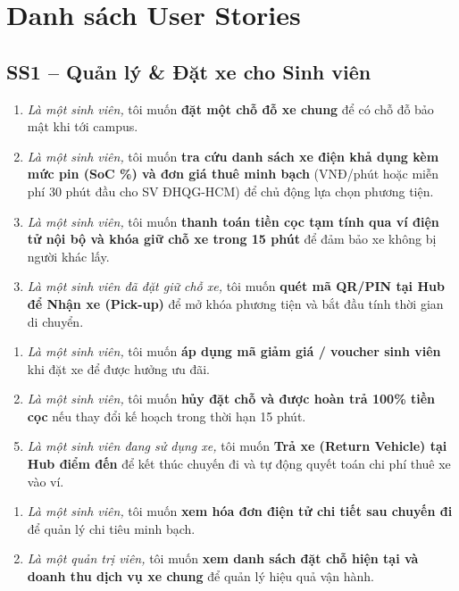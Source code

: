 \documentclass[12pt,a4paper]{report}
\begin{document}
\section{Danh sách User Stories}

\subsection{SS1 -- Quản lý \& Đặt xe cho Sinh viên}
\begin{enumerate}[nosep,label=\textbf{US-\arabic*:}]
    \item \textit{Là một sinh viên,} tôi muốn \textbf{đặt một chỗ đỗ xe chung} để có chỗ đỗ bảo mật khi tới campus.
    \item \textit{Là một sinh viên,} tôi muốn \textbf{tra cứu danh sách xe điện khả dụng kèm mức pin (SoC \%) và đơn giá thuê minh bạch} (VNĐ/phút hoặc miễn phí 30 phút đầu cho SV ĐHQG-HCM) để chủ động lựa chọn phương tiện.
    \item \textit{Là một sinh viên,} tôi muốn \textbf{thanh toán tiền cọc tạm tính qua ví điện tử nội bộ và khóa giữ chỗ xe trong 15 phút} để đảm bảo xe không bị người khác lấy.
\end{enumerate}
\begin{enumerate}[nosep,label=\textbf{US-\arabic*b:}]
    \setcounter{enumi}{2}
    \item \textit{Là một sinh viên đã đặt giữ chỗ xe,} tôi muốn \textbf{quét mã QR/PIN tại Hub để Nhận xe (Pick-up)} để mở khóa phương tiện và bắt đầu tính thời gian di chuyển.
\end{enumerate}
\begin{enumerate}[nosep,label=\textbf{US-0\arabic*:},start=4]
    \item \textit{Là một sinh viên,} tôi muốn \textbf{áp dụng mã giảm giá / voucher sinh viên} khi đặt xe để được hưởng ưu đãi.
    \item \textit{Là một sinh viên,} tôi muốn \textbf{hủy đặt chỗ và được hoàn trả 100\% tiền cọc} nếu thay đổi kế hoạch trong thời hạn 15 phút.
\end{enumerate}
\begin{enumerate}[nosep,label=\textbf{US-\arabic*b:}]
    \setcounter{enumi}{4}
    \item \textit{Là một sinh viên đang sử dụng xe,} tôi muốn \textbf{Trả xe (Return Vehicle) tại Hub điểm đến} để kết thúc chuyến đi và tự động quyết toán chi phí thuê xe vào ví.
\end{enumerate}
\begin{enumerate}[nosep,label=\textbf{US-0\arabic*:},start=6]
    \item \textit{Là một sinh viên,} tôi muốn \textbf{xem hóa đơn điện tử chi tiết sau chuyến đi} để quản lý chi tiêu minh bạch.
    \item \textit{Là một quản trị viên,} tôi muốn \textbf{xem danh sách đặt chỗ hiện tại và doanh thu dịch vụ xe chung} để quản lý hiệu quả vận hành.
\end{enumerate}
\end{document}
